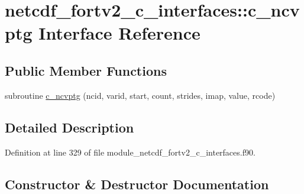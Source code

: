 \hypertarget{interfacenetcdf__fortv2__c__interfaces_1_1c__ncvptg}{}\section{netcdf\+\_\+fortv2\+\_\+c\+\_\+interfaces\+:\+:c\+\_\+ncvptg Interface Reference}
\label{interfacenetcdf__fortv2__c__interfaces_1_1c__ncvptg}
\subsection*{Public Member Functions}
\begin{DoxyCompactItemize}
\item 
subroutine \hyperlink{interfacenetcdf__fortv2__c__interfaces_1_1c__ncvptg_a70966fba54a7171117104ed373585a1a}{c\+\_\+ncvptg} (ncid, varid, start, count, strides, imap, value, rcode)
\end{DoxyCompactItemize}


\subsection{Detailed Description}


Definition at line 329 of file module\+\_\+netcdf\+\_\+fortv2\+\_\+c\+\_\+interfaces.\+f90.



\subsection{Constructor \& Destructor Documentation}
\mbox{\label{interfacenetcdf__fortv2__c__interfaces_1_1c__ncvptg_a70966fba54a7171117104ed373585a1a}} 
